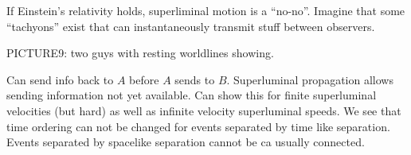 If Einstein's relativity holds, superliminal motion is a ``no-no''.  Imagine that some ``tachyons'' exist that can instantaneously transmit stuff between observers.

PICTURE9: two guys with resting worldlines showing.

Can send info back to $A$ before $A$ sends to $B$.  Superluminal propagation allows sending information not yet available.  Can show this for finite superluminal velocities (but hard) as well as infinite velocity superluminal speeds.  We see that time ordering can not be changed for events separated by time like separation.  Events separated by spacelike separation cannot be ca usually connected.

\EndArticle
